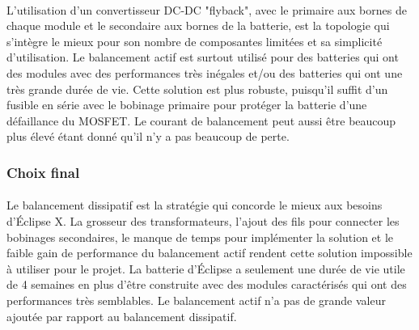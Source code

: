 \paragraph*{}
L'utilisation d'un convertisseur DC-DC "flyback", avec le primaire aux bornes de chaque module et le secondaire aux bornes de la batterie, est la topologie qui s'intègre le mieux pour son nombre de composantes limitées et sa simplicité d'utilisation. Le balancement actif est surtout utilisé pour des batteries qui ont des modules avec des performances très inégales et/ou des batteries qui ont une très grande durée de vie. Cette solution est plus robuste, puisqu'il suffit d'un fusible en série avec le bobinage primaire pour protéger la batterie d'une défaillance du MOSFET. Le courant de balancement peut aussi être beaucoup plus élevé étant donné qu'il n'y a pas beaucoup de perte.

\subsubsection*{Choix final}
\paragraph*{}
Le balancement dissipatif est la stratégie qui concorde le mieux aux besoins d'Éclipse X. La grosseur des transformateurs, l'ajout des fils pour connecter les bobinages secondaires, le manque de temps pour implémenter la solution et le faible gain de performance du balancement actif rendent cette solution impossible à utiliser pour le projet. La batterie d'Éclipse a seulement une durée de vie utile de 4 semaines en plus d'être construite avec des modules caractérisés qui ont des performances très semblables. Le balancement actif n'a pas de grande valeur ajoutée par rapport au balancement dissipatif.

\newpage

